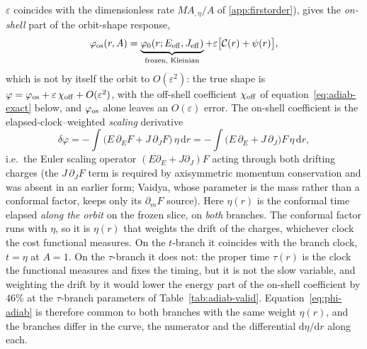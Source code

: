 \documentclass[12pt]{iopart}
\theoremstyle{plain}
\theoremstyle{definition}
\theoremstyle{remark}
\newcommand{\Ehat}{\hat E}
\newcommand{\dd}{\mathrm{d}}
\begin{document}
$\varepsilon$ coincides with the dimensionless rate $M A_{,\eta}/A$ of \ref{app:firstorder}),
gives the \emph{on-shell}
part of the orbit-shape response,
\begin{equation}
    \varphi_{\rm os}(r,A)=\underbrace{\varphi_0(r;E_{\rm eff},J_{\rm eff})}_{\text{frozen, Kleinian}}
    +\varepsilon\big[\mathcal{C}(r)+\psi(r)\big],
    \label{eq:phi-adiab}
\end{equation}
which is not by itself the orbit to $O(\varepsilon^2)$: the true shape is
$\varphi=\varphi_{\rm os}+\varepsilon\,\chi_{\rm off}+O(\varepsilon^2)$, with the
off-shell coefficient $\chi_{\rm off}$ of equation~\eqref{eq:adiab-exact} below, and
$\varphi_{\rm os}$ alone leaves an $O(\varepsilon)$ error. The on-shell coefficient is the
elapsed-clock--weighted \emph{scaling} derivative
\begin{equation}
    \delta\varphi=-\!\int\!\big(\Ehat\,\partial_E F+J\,\partial_J F\big)\,\eta\,\dd r
    =-\!\int\!\big(E\,\partial_E+J\,\partial_J\big)F\,\eta\,\dd r,
    \label{eq:deltaphi-EJ}
\end{equation}
i.e.\ the Euler scaling operator $(E\partial_E+J\partial_J)F$ acting through both
drifting charges (the $J\,\partial_J F$ term is required by axisymmetric momentum
conservation and was absent in an earlier form; Vaidya, whose parameter is the
mass rather than a conformal factor, keeps only its $\partial_m F$ source). Here
$\eta(r)$ is the conformal time elapsed \emph{along the orbit} on the frozen
slice, on \emph{both} branches. The conformal factor runs with $\eta$, so it is
$\eta(r)$ that weights the drift of the charges, whichever clock the cost
functional measures. On the $t$-branch it coincides with the branch clock,
$t=\eta$ at $A=1$. On the $\tau$-branch it does not: the proper time $\tau(r)$ is
the clock the functional measures and fixes the timing, but it is not the slow
variable, and weighting the drift by it would lower the energy part of the
on-shell coefficient by $46\%$ at the $\tau$-branch parameters of
Table~\ref{tab:adiab-valid}.
Equation~\eqref{eq:phi-adiab} is therefore common to both branches with the
same weight $\eta(r)$, and the branches differ in the curve, the numerator and
the differential $\dd\eta/\dd r$ along each.
\end{document}
